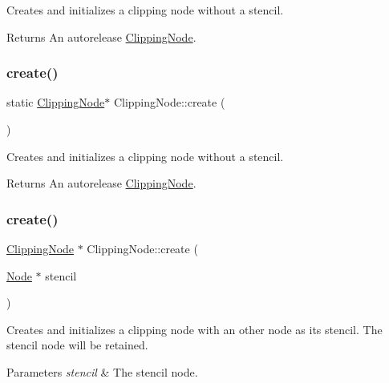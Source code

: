 Creates and initializes a clipping node without a stencil.

\begin{DoxyReturn}{Returns}
An autorelease \hyperlink{classClippingNode}{Clipping\+Node}. 
\end{DoxyReturn}
\mbox{\label{classClippingNode_a028bfbb82ba7321390e16bada44086e9}} 
\subsubsection{\texorpdfstring{create()}{create()}\hspace{0.1cm}{\footnotesize\ttfamily [2/4]}}
{\footnotesize\ttfamily static \hyperlink{classClippingNode}{Clipping\+Node}$\ast$ Clipping\+Node\+::create (\begin{DoxyParamCaption}{ }\end{DoxyParamCaption})\hspace{0.3cm}{\ttfamily [static]}}

Creates and initializes a clipping node without a stencil.

\begin{DoxyReturn}{Returns}
An autorelease \hyperlink{classClippingNode}{Clipping\+Node}. 
\end{DoxyReturn}
\mbox{\label{classClippingNode_a61c10eedd27bd820bf9fa652f3c0e509}} 
\subsubsection{\texorpdfstring{create()}{create()}\hspace{0.1cm}{\footnotesize\ttfamily [3/4]}}
{\footnotesize\ttfamily \hyperlink{classClippingNode}{Clipping\+Node} $\ast$ Clipping\+Node\+::create (\begin{DoxyParamCaption}\item[{\hyperlink{classNode}{Node} $\ast$}]{stencil }\end{DoxyParamCaption})\hspace{0.3cm}{\ttfamily [static]}}

Creates and initializes a clipping node with an other node as its stencil. The stencil node will be retained. 
\begin{DoxyParams}{Parameters}
{\em stencil} & The stencil node. \\
\hline
\end{DoxyParams}
\mbox{\label{classClippingNode_a6cce59a4e9c6b0705343945cd1a3aa71}} 
